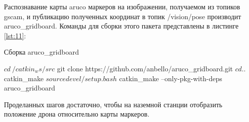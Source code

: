 Распознавание карты aruco маркеров на изображении, получаемом из топиков gscam, и публикацию полученных координат в топик /vision/pose производит aruco\_gridboard. Команды для сборки этого пакета представлены в листинге \ref{lst:11}:
\begin{Program}[H]
	\caption{Сборка aruco\_gridboard} \label{lst:11}
\begin{MyCode}
$ cd ~/catkin_ws/src
$ git clone https://github.com/anbello/aruco_gridboard.git
$ cd ..
$ catkin_make
$ source devel/setup.bash
$ catkin_make --only-pkg-with-deps aruco_gridboard
\end{MyCode}
\end{Program}

Проделанных шагов достаточно, чтобы на наземной станции отобразить положение дрона относительно карты маркеров.


